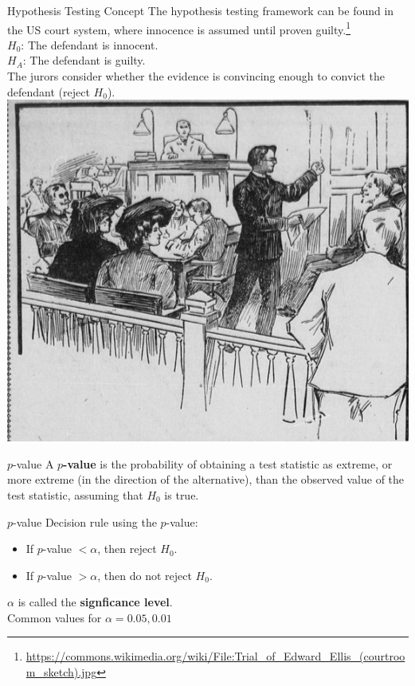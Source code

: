 \documentclass[fleqn, 10pt]{beamer}\usepackage[]{graphicx}\usepackage[]{color}
\begin{document}
\begin{frame}{Hypothesis Testing Concept}
The hypothesis testing framework can be found in the US court system, where innocence is assumed until proven guilty.\footnote{\tiny \url{https://commons.wikimedia.org/wiki/File:Trial_of_Edward_Ellis_(courtroom_sketch).jpg}}\\
\vspace{5pt}
$H_0$:  The defendant is innocent.\\
$H_A$:  The defendant is guilty.\\
\vspace{5pt}
The jurors consider whether the evidence is convincing enough to convict the defendant (reject $H_0$).\\
\flushright
\includegraphics[scale=0.2]{figure/courtroom_sketch.jpg}
\end{frame}

\begin{frame}{$p$-value}
A \textbf{$p$-value} is the probability of obtaining a test statistic as extreme, or more extreme (in the direction of the alternative), than the observed value of the test statistic, assuming that $H_0$ is true.\\
\end{frame}

\begin{frame}{$p$-value}
Decision rule using the $p$-value:
\vspace{5pt}
\begin{itemize}
\item If $p$-value $< \alpha$, then reject $H_0$.
\item If $p$-value $> \alpha$, then do not reject $H_0$.
\end{itemize}
\vspace{10pt}
$\alpha$ is called the \textbf{signficance level}.\\  
Common values for $\alpha=0.05, 0.01$\\
\end{frame}
\end{document}
